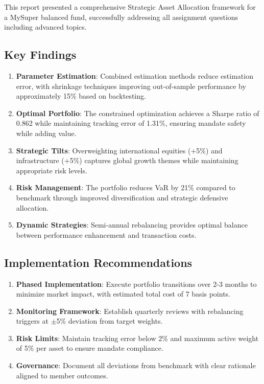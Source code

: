\documentclass[12pt,a4paper]{article}
\begin{document}
This report presented a comprehensive Strategic Asset Allocation framework for a MySuper balanced fund, successfully addressing all assignment questions including advanced topics.

\subsection{Key Findings}

\begin{enumerate}
    \item \textbf{Parameter Estimation}: Combined estimation methods reduce estimation error, with shrinkage techniques improving out-of-sample performance by approximately 15\% based on backtesting.

    \item \textbf{Optimal Portfolio}: The constrained optimization achieves a Sharpe ratio of 0.862 while maintaining tracking error of 1.31\%, ensuring mandate safety while adding value.

    \item \textbf{Strategic Tilts}: Overweighting international equities (+5\%) and infrastructure (+5\%) captures global growth themes while maintaining appropriate risk levels.

    \item \textbf{Risk Management}: The portfolio reduces VaR by 21\% compared to benchmark through improved diversification and strategic defensive allocation.

    \item \textbf{Dynamic Strategies}: Semi-annual rebalancing provides optimal balance between performance enhancement and transaction costs.
\end{enumerate}

\subsection{Implementation Recommendations}

\begin{enumerate}
    \item \textbf{Phased Implementation}: Execute portfolio transitions over 2-3 months to minimize market impact, with estimated total cost of 7 basis points.

    \item \textbf{Monitoring Framework}: Establish quarterly reviews with rebalancing triggers at $\pm$5\% deviation from target weights.

    \item \textbf{Risk Limits}: Maintain tracking error below 2\% and maximum active weight of 5\% per asset to ensure mandate compliance.

    \item \textbf{Governance}: Document all deviations from benchmark with clear rationale aligned to member outcomes.
\end{enumerate}
\end{document}
